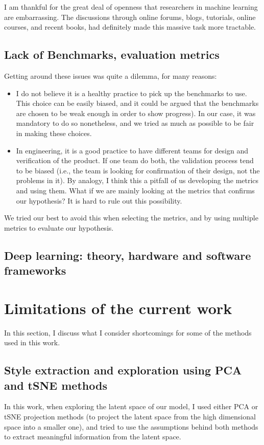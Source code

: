 \par I am thankful for the great deal of openness that researchers in machine learning are embarrassing. The discussions through online forums, blogs, tutorials, online courses, and recent books, had definitely made this massive task more tractable.

\subsection{Lack of Benchmarks, evaluation metrics}
Getting around these issues was quite a dilemma, for many reasons:

\begin{itemize}
    \item I do not believe it is a healthy practice to pick up the benchmarks to use. This choice can be easily biased, and it could be argued that the benchmarks are chosen to be weak enough in order to show progress). In our case, it was mandatory to do so nonetheless, and we tried as much as possible to be fair in making these choices.
    \item In engineering, it is a good practice to have different teams for design and verification of the product. If one team do both, the validation process tend to be biased (i.e., the team is looking for confirmation of their design, not the problems in it). By analogy, I think this a pitfall of us developing the metrics and using them. What if we are mainly looking at the metrics that confirms our hypothesis? It is hard to rule out this possibility.
\end{itemize}

We tried our best to avoid this when selecting the metrics, and by using multiple metrics to evaluate our hypothesis.

\subsection{Deep learning: theory, hardware and software frameworks}
\par

\section{Limitations of the current work}
In this section, I discuss what I consider shortcomings for some of the methods used in this work.

\subsection{Style extraction and exploration using PCA and tSNE methods}
In this work, when exploring the latent space of our model, I used either PCA or tSNE projection methods (to project the latent space from the high dimensional space into a smaller one), and tried to use the assumptions behind both methods to extract meaningful information from the latent space.

